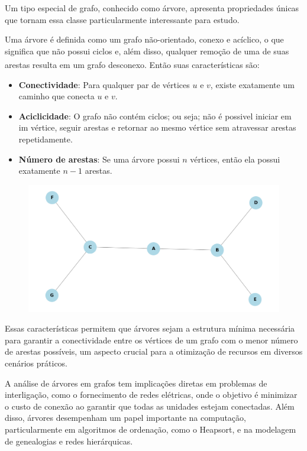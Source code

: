\documentclass[12pt, a4paper]{scrreprt}
\begin{document}
Um tipo especial de grafo, conhecido como árvore, apresenta propriedades únicas que tornam essa classe particularmente interessante para estudo.

Uma árvore é definida como um grafo não-orientado, conexo e acíclico, o que significa que não possui ciclos e, além disso, qualquer remoção de uma de suas arestas resulta em um grafo desconexo.\textsuperscript{\cite{definicaoarvore}} Então suas características são:

\begin{itemize}
        \item \textbf{Conectividade}: Para qualquer par de vértices \( u \) e \( v \), existe exatamente um caminho que conecta \( u \) e \( v \).
        \item \textbf{Aciclicidade}: O grafo não contém ciclos; ou seja; não é possivel iniciar em im vértice, seguir arestas e retornar ao mesmo vértice sem atravessar arestas repetidamente.
        \item \textbf{Número de arestas}: Se uma árvore possui \( n \) vértices, então ela possui exatamente \( n - 1 \) arestas.
\end{itemize}

\begin{figure}[h]
    \centering
    \includegraphics[width=.65\textwidth]{src/arvore_exemplo.png}
    \label{fig:exemplo de árvore}
\end{figure}

Essas características permitem que árvores sejam a estrutura mínima necessária para garantir a conectividade entre os vértices de um grafo com o menor número de arestas possíveis, um aspecto crucial para a otimização de recursos em diversos cenários práticos.

A análise de árvores em grafos tem implicações diretas em problemas de interligação, como o fornecimento de redes elétricas, onde o objetivo é minimizar o custo de conexão ao garantir que todas as unidades estejam conectadas. Além disso, árvores desempenham um papel importante na computação, particularmente em algoritmos de ordenação, como o Heapsort, e na modelagem de genealogias e redes hierárquicas.
\end{document}
